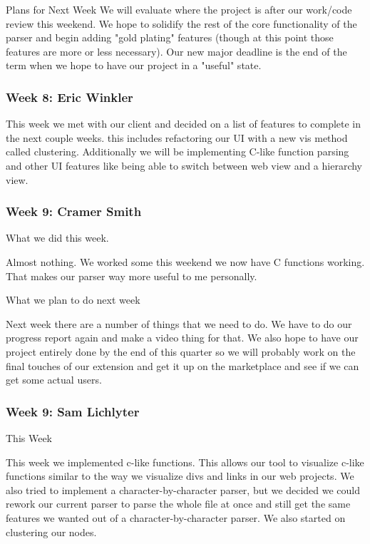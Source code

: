 Plans for Next Week
We will evaluate where the project is after our work/code review this weekend. We hope to solidify the rest of the core functionality of the parser and begin adding "gold plating" features (though at this point those features are more or less necessary). Our new major deadline is the end of the term when we hope to have our project in a "useful" state.

\subsubsection{Week 8: Eric Winkler}

This week we met with our client and decided on a list of features to complete in the next couple weeks. this includes refactoring our UI with a new vis method called clustering. Additionally we will be implementing C-like function parsing and  other UI features like being able to switch between web view and a hierarchy view.

\subsubsection{Week 9: Cramer Smith}

What we did this week.

Almost nothing. We worked some this weekend we now have C functions working. That makes our parser way more useful to me personally. 

What we plan to do next week

Next week there are a number of things that we need to do. We have to do our progress report again and make a video thing for that. We also hope to have our project entirely done by the end of this quarter so we will probably work on the final touches of our extension and get it up on the marketplace and see if we can get some actual users. 

\subsubsection{Week 9: Sam Lichlyter}

This Week

This week we implemented c-like functions. This allows our tool to visualize c-like functions similar to the way we visualize divs and links in our web projects. We also tried to implement a character-by-character parser, but we decided we could rework our current parser to parse the whole file at once and still get the same features we wanted out of a character-by-character parser. We also started on clustering our nodes.

